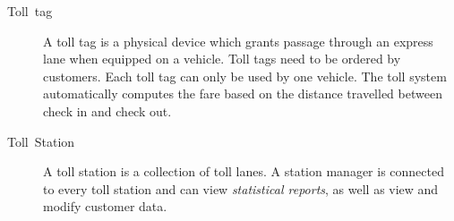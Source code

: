 \begin{description}
\item [{Toll~tag}] A toll tag is a physical device which grants passage
through an express lane when equipped on a vehicle. Toll tags need
to be ordered by customers. Each toll tag can only be used by one vehicle. The
toll system automatically computes the fare based on
the distance travelled between check in and check out.

\item [{Toll~Station}] A toll station is a collection of toll lanes. A
station manager is connected to every toll station and can view \emph{statistical
reports}, as well as view and modify customer data.







\end{description}
